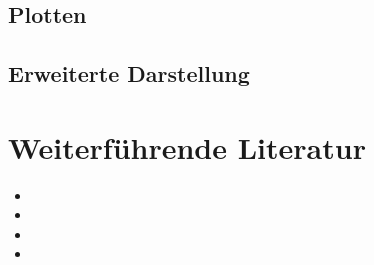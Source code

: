 \documentclass[10pt,a4paper]{article}
\begin{document}
    \subsection{Plotten}
    \subsection{Erweiterte Darstellung}

\section{Weiterführende Literatur}
\begin{itemize}
    \item {} 
    \item {}
    \item {}
    \item {}
  \end{itemize}
\end{document}
